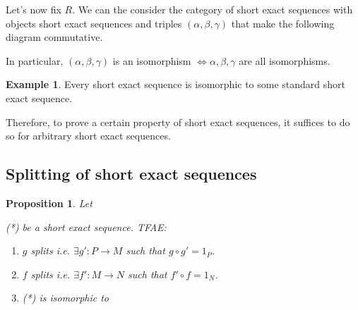 \documentclass{article}
\theoremstyle{definition}
\newtheorem{eg}{Example}[subsection]
\theoremstyle{remark}
\theoremstyle{plain}
\newtheorem{prop}{Proposition}[subsection]
\begin{document}
Let's now fix \(R\). We can the consider the category of short exact sequences with objects short exact sequences and triples \((\alpha, \beta, \gamma)\) that make the following diagram commutative. 

\begin{figure}[h]
\centering
{}
\end{figure}

In particular, \((\alpha, \beta, \gamma)\) is an isomorphism \(\iff \alpha, \beta, \gamma\) are all isomorphisms.

\begin{eg}
    Every short exact sequence is isomorphic to some standard short exact sequence. 

    \begin{figure}[h]
        \centering
        \end{figure}

    Therefore, to prove a certain property of short exact sequences, it suffices to do so for arbitrary short exact sequences. 

\end{eg}

\subsection{Splitting of short exact sequences}

\begin{prop}
    Let  (*) be a short exact sequence. TFAE:
    \begin{enumerate}
        \item \(g\) splits i.e. \(\exists g': P \to M\) such that \(g\circ g' = 1_P\).
        \item \(f\) splits i.e. \(\exists f': M \to N\) such that \(f'\circ f = 1_N\).
        \item (*) is isomorphic to 
    \end{enumerate}
\end{prop}
\end{document}
